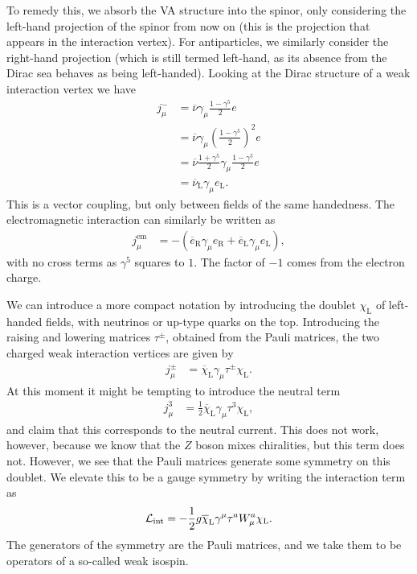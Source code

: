 To remedy this, we absorb the VA structure into the spinor, only considering the left-hand projection of the spinor from now on (this is the projection that appears in the interaction vertex). For antiparticles, we similarly consider the right-hand projection (which is still termed left-hand, as its absence from the Dirac sea behaves as being left-handed). Looking at the Dirac structure of a weak interaction vertex we have
\begin{align*}
	j_{\mu}^{-} &= \overline{\nu}\gamma_{\mu}\frac{1 - \gamma^{5}}{2}e \\
	            &= \overline{\nu}\gamma_{\mu}\left(\frac{1 - \gamma^{5}}{2}\right)^{2}e \\
	            &= \overline{\nu}\frac{1 + \gamma^{5}}{2}\gamma_{\mu}\frac{1 - \gamma^{5}}{2}e \\
	            &= \overline{\nu}_{\text{L}}\gamma_{\mu}e_{\text{L}}.
\end{align*}
This is a vector coupling, but only between fields of the same handedness. The electromagnetic interaction can similarly be written as
\begin{align*}
	j_{\mu}^{\text{em}} &= -\left(\overline{e}_{\text{R}}\gamma_{\mu}e_{\text{R}} + \overline{e}_{\text{L}}\gamma_{\mu}e_{\text{L}}\right),
\end{align*}
with no cross terms as $\gamma^{5}$ squares to $1$. The factor of $-1$ comes from the electron charge.

We can introduce a more compact notation by introducing the doublet $\chi_{\text{L}}$ of left-handed fields, with neutrinos or up-type quarks on the top. Introducing the raising and lowering matrices $\tau^{\pm}$, obtained from the Pauli matrices, the two charged weak interaction vertices are given by
\begin{align*}
	j_{\mu}^{\pm} &= \overline{\chi}_{\text{L}}\gamma_{\mu}\tau^{\pm}\chi_{\text{L}}.
\end{align*}
At this moment it might be tempting to introduce the neutral term
\begin{align*}
	j_{\mu}^{3} &= \frac{1}{2}\overline{\chi}_{\text{L}}\gamma_{\mu}\tau^{3}\chi_{\text{L}},
\end{align*}
and claim that this corresponds to the neutral current. This does not work, however, because we know that the $Z$ boson mixes chiralities, but this term does not. However, we see that the Pauli matrices generate some symmetry on this doublet. We elevate this to be a gauge symmetry by writing the interaction term as
\begin{align*}
	\mathcal{L}_{\text{int}} = -\frac{1}{2}g\overline{\chi}_{\text{L}}\gamma^{\mu}\tau^{a}W_{\mu}^{a}\chi_{\text{L}}.
\end{align*}
The generators of the symmetry are the Pauli matrices, and we take them to be operators of a so-called weak isospin.

